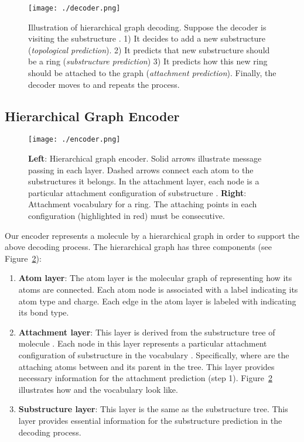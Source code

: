 \documentclass{article} \usepackage{iclr2020_conference,times}
\begin{document}
\begin{figure}[t]
    \centering
    \texttt{[image: ./decoder.png]}
    \caption{Illustration of hierarchical graph decoding. Suppose the decoder is visiting the substructure . 1) It decides to add a new substructure (\emph{topological prediction}). 2) It predicts that new substructure  should be a ring (\emph{substructure prediction}) 3) It predicts how this new ring should be attached to the graph (\emph{attachment prediction}). Finally, the decoder moves to  and repeats the process.}
    \label{fig:decoder}
\end{figure}

\subsection{Hierarchical Graph Encoder}
\label{sec:encoder}
\begin{figure}
    \centering
    \texttt{[image: ./encoder.png]}
    \caption{\textbf{Left}: Hierarchical graph encoder. Solid arrows illustrate message passing in each layer. Dashed arrows connect each atom to the substructures it belongs. In the attachment layer, each node  is a particular attachment configuration of substructure . \textbf{Right}: Attachment vocabulary for a ring. The attaching points in each configuration (highlighted in red) must be consecutive.} \label{fig:encoder}
    \vspace{-5pt}
\end{figure}

Our encoder represents a molecule  by a hierarchical graph  in order to support the above decoding process. The hierarchical graph has three components (see Figure~\ref{fig:encoder}):


\begin{enumerate}[leftmargin=*,topsep=0pt,itemsep=0pt] 
    \item \textbf{Atom layer}: The atom layer is the molecular graph of  representing how its atoms are connected. Each atom node  is associated with a label  indicating its atom type and charge. Each edge  in the atom layer is labeled with  indicating its bond type.
    
    \item \textbf{Attachment layer}: This layer is derived from the substructure tree of molecule . Each node  in this layer represents a particular attachment configuration of substructure  in the vocabulary . Specifically,  where  are the attaching atoms between  and its parent  in the tree. This layer provides necessary information for the attachment prediction (step 1). Figure~\ref{fig:encoder} illustrates how  and the vocabulary  look like.
    
    \item \textbf{Substructure layer}: This layer is the same as the substructure tree. This layer provides essential information for the substructure prediction in the decoding process.
\end{enumerate}
\end{document}
